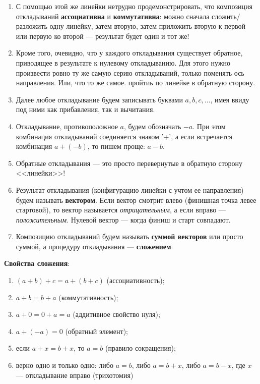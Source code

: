 \begin{enumerate}\setlength{\itemsep}{1pt}\setcounter{enumi}{7}
\item С помощью этой же линейки нетрудно продемонстрировать, что композиция откладываний \textbf{ассоциативна} и \textbf{коммутативна}: можно сначала сложить/разложить одну линейку, затем вторую, затем приложить вторую к первой или первую ко второй --- результат будет один и тот же!
\item Кроме того, очевидно, что у каждого откладывания существует обратное, приводящее в результате к нулевому откладыванию. Для этого нужно произвести ровно ту же самую серию откладываний, только поменять ось направления. Или, что то же самое. пройтиь по линейке в обратную сторону.
\item Далее любое откладывание будем записывать буквами $a,b,c,\dots$, имея ввиду под ними как прибавления, так и вычитания.
\item Откладывание, противоположное $a$, будем обозначать $-a$. При этом комбинация откладываний соединяется знаком '+', а если встречается комбинация $a+(-b)$, то пишем проще: $a-b$.
\item Обратные откладывания --- это просто перевернутые в обратную сторону <<линейки>>!
\item Результат откладывания (конфигурацию линейки с учтом ее направления) будем называть \textbf{вектором}. Если вектор смотрит влево (финишная точка левее стартовой), то вектор называется \textit{отрицательным}, а если вправо --- \textit{положительным}. Нулевой вектор --- когда финиш и старт совпадают.
\item Композицию откладываний будем называть \textbf{суммой векторов} или просто суммой, а процедуру откладывания --- \textbf{сложением}.
\end{enumerate}

\textbf{Свойства сложения}:
\begin{enumerate}[label=S\arabic*]
\item $(a+b)+c=a+(b+c)$ (ассоциативность);
\item $a+b=b+a$ (коммутативность);
\item $a+0=0+a=a$ (аддитивное свойство нуля);
\item $a+(-a)=0$ (обратный элемент);
\item если $a+x=b+x$, то $a=b$ (правило сокращения);
\item верно одно и только одно: либо $a=b$, либо $a=b+x$, либо $a=b-x$, где $x$ --- откладывание вправо (трихотомия)
\end{enumerate}
